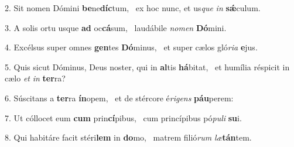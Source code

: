 2. Sit nomen Dómini \textbf{be}ne\textbf{díc}tum, \ast\  ex hoc nunc, et us\textit{que} \textit{in} \textbf{sǽ}culum.\

3. A solis ortu usque \textbf{ad} oc\textbf{cá}sum, \ast\  laudábile \textit{no}\textit{men} \textbf{Dó}mini.\

4. Excélsus super omnes \textbf{gen}tes \textbf{Dó}minus, \ast\  et super cælos gló\textit{ri}\textit{a} \textbf{e}jus.\

5. Quis sicut Dóminus, Deus noster, qui in \textbf{al}tis \textbf{há}bitat, \ast\  et humília réspicit in cælo \textit{et} \textit{in} \textbf{ter}ra?\

6. Súscitans a \textbf{ter}ra \textbf{ín}opem, \ast\  et de stércore é\textit{ri}\textit{gens} \textbf{páu}perem:\

7. Ut cóllocet eum \textbf{cum} prin\textbf{cí}pibus, \ast\  cum princípibus pó\textit{pu}\textit{li} \textbf{su}i.\

8. Qui habitáre facit stéri\textbf{lem} in \textbf{do}mo, \ast\  matrem filió\textit{rum} \textit{læ}\textbf{tán}tem.\


